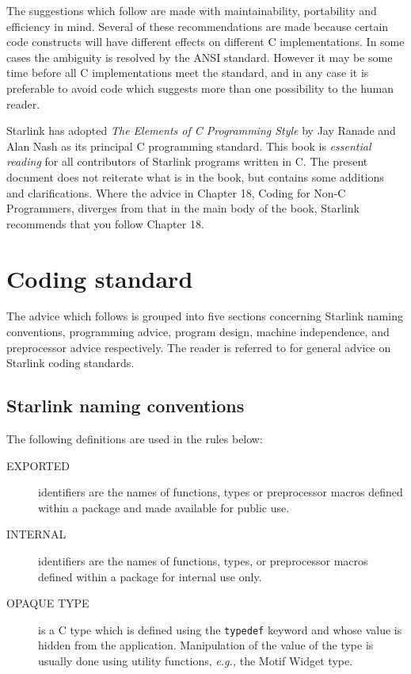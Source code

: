 \documentclass[twoside,11pt,nolof,noabs]{starlink}
\begin{document}
The suggestions which follow are made with maintainability, portability and
efficiency in mind.
Several of these recommendations are made because certain code constructs
will have different effects on different C  implementations.
In some cases the ambiguity is resolved by the ANSI  standard.
However it may be some time before all C implementations meet the standard,
and in any case it is preferable to avoid code which suggests more than one
possibility to the human reader.

Starlink has adopted {\sl The Elements of C Programming Style} by Jay Ranade
and Alan Nash as its principal C programming standard.  This book is
\textit{essential reading}\/ for all contributors of Starlink programs written in
C. The present document does not reiterate
what is in the book, but contains some additions and clarifications.  Where
the advice in Chapter 18, Coding for Non-C Programmers, diverges from
that in the main body of the book, Starlink recommends that you follow
Chapter 18.


\section{Coding standard}

The advice which follows is grouped into five sections concerning
Starlink naming conventions, programming advice, program design,
machine independence, and preprocessor advice respectively.  The reader is
referred to  for general advice on Starlink coding standards.

\subsection{Starlink naming conventions}

The following definitions are used in the rules below:

\begin{description}
\item [EXPORTED] identifiers are the names of functions, types or preprocessor
macros defined within a package and made available for public use.
\item [INTERNAL] identifiers are the names of functions, types, or
preprocessor macros defined within a package for internal use only.
\item [OPAQUE TYPE] is a C type which is defined using the \verb~typedef~
keyword and whose
value is hidden from the application.  Manipulation of the value of the type
is usually done using utility functions, \emph{e.g.,} the Motif Widget type.
\end{description}
\end{document}
